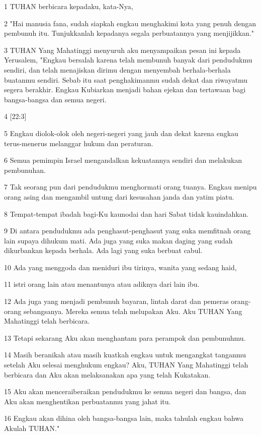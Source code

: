 \par 1 TUHAN berbicara kepadaku, kata-Nya,
\par 2 "Hai manusia fana, sudah siapkah engkau menghakimi kota yang penuh dengan pembunuh itu. Tunjukkanlah kepadanya segala perbuatannya yang menjijikkan."
\par 3 TUHAN Yang Mahatinggi menyuruh aku menyampaikan pesan ini kepada Yerusalem, "Engkau bersalah karena telah membunuh banyak dari pendudukmu sendiri, dan telah menajiskan dirimu dengan menyembah berhala-berhala buatanmu sendiri. Sebab itu saat penghakimanmu sudah dekat dan riwayatmu segera berakhir. Engkau Kubiarkan menjadi bahan ejekan dan tertawaan bagi bangsa-bangsa dan semua negeri.
\par 4 [22:3]
\par 5 Engkau diolok-olok oleh negeri-negeri yang jauh dan dekat karena engkau terus-menerus melanggar hukum dan peraturan.
\par 6 Semua pemimpin Israel mengandalkan kekuatannya sendiri dan melakukan pembunuhan.
\par 7 Tak seorang pun dari pendudukmu menghormati orang tuanya. Engkau menipu orang asing dan mengambil untung dari kesusahan janda dan yatim piatu.
\par 8 Tempat-tempat ibadah bagi-Ku kaunodai dan hari Sabat tidak kauindahkan.
\par 9 Di antara pendudukmu ada penghasut-penghasut yang suka memfitnah orang lain supaya dihukum mati. Ada juga yang suka makan daging yang sudah dikurbankan kepada berhala. Ada lagi yang suka berbuat cabul.
\par 10 Ada yang menggoda dan meniduri ibu tirinya, wanita yang sedang haid,
\par 11 istri orang lain atau menantunya atau adiknya dari lain ibu.
\par 12 Ada juga yang menjadi pembunuh bayaran, lintah darat dan pemeras orang-orang sebangsanya. Mereka semua telah melupakan Aku. Aku TUHAN Yang Mahatinggi telah berbicara.
\par 13 Tetapi sekarang Aku akan menghantam para perampok dan pembunuhmu.
\par 14 Masih beranikah atau masih kuatkah engkau untuk mengangkat tanganmu setelah Aku selesai menghukum engkau? Aku, TUHAN Yang Mahatinggi telah berbicara dan Aku akan melaksanakan apa yang telah Kukatakan.
\par 15 Aku akan menceraiberaikan pendudukmu ke semua negeri dan bangsa, dan Aku akan menghentikan perbuatanmu yang jahat itu.
\par 16 Engkau akan dihina oleh bangsa-bangsa lain, maka tahulah engkau bahwa Akulah TUHAN."
